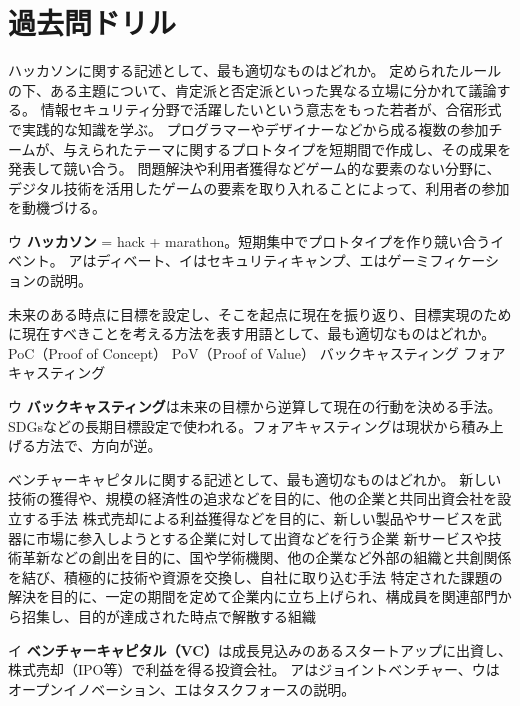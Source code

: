 \section{過去問ドリル}


\begin{itpmon}{%
ハッカソンに関する記述として、最も適切なものはどれか。}
\sentakushi
  {定められたルールの下、ある主題について、肯定派と否定派といった異なる立場に分かれて議論する。}
  {情報セキュリティ分野で活躍したいという意志をもった若者が、合宿形式で実践的な知識を学ぶ。}
  {プログラマーやデザイナーなどから成る複数の参加チームが、与えられたテーマに関するプロトタイプを短期間で作成し、その成果を発表して競い合う。}
  {問題解決や利用者獲得などゲーム的な要素のない分野に、デジタル技術を活用したゲームの要素を取り入れることによって、利用者の参加を動機づける。}
\end{itpmon}
\begin{kaisetsu}{ウ}
\textbf{ハッカソン} = hack + marathon。短期集中でプロトタイプを作り競い合うイベント。
アはディベート、イはセキュリティキャンプ、エはゲーミフィケーションの説明。
\end{kaisetsu}

\begin{itpmon}{%
未来のある時点に目標を設定し、そこを起点に現在を振り返り、目標実現のために現在すべきことを考える方法を表す用語として、最も適切なものはどれか。}
\sentakushi
  {PoC（Proof of Concept）}
  {PoV（Proof of Value）}
  {バックキャスティング}
  {フォアキャスティング}
\end{itpmon}
\begin{kaisetsu}{ウ}
\textbf{バックキャスティング}は未来の目標から逆算して現在の行動を決める手法。SDGsなどの長期目標設定で使われる。フォアキャスティングは現状から積み上げる方法で、方向が逆。
\end{kaisetsu}

\begin{itpmon}{%
ベンチャーキャピタルに関する記述として、最も適切なものはどれか。}
\sentakushi
  {新しい技術の獲得や、規模の経済性の追求などを目的に、他の企業と共同出資会社を設立する手法}
  {株式売却による利益獲得などを目的に、新しい製品やサービスを武器に市場に参入しようとする企業に対して出資などを行う企業}
  {新サービスや技術革新などの創出を目的に、国や学術機関、他の企業など外部の組織と共創関係を結び、積極的に技術や資源を交換し、自社に取り込む手法}
  {特定された課題の解決を目的に、一定の期間を定めて企業内に立ち上げられ、構成員を関連部門から招集し、目的が達成された時点で解散する組織}
\end{itpmon}
\begin{kaisetsu}{イ}
\textbf{ベンチャーキャピタル（VC）}は成長見込みのあるスタートアップに出資し、株式売却（IPO等）で利益を得る投資会社。
アはジョイントベンチャー、ウはオープンイノベーション、エはタスクフォースの説明。
\end{kaisetsu}


